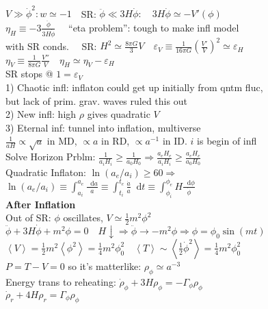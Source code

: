 \documentclass[12pt]{article}
\newcommand*\diff{\mathop{}\!\mathrm{d}}
\newcommand{\ve}{\varepsilon}
\begin{document}
{	\\$V\gg \dot{\phi}^2: w \simeq -1 \quad$SR: $\ddot{\phi}\ll 3H\dot{\phi}: \quad 3H\dot{\phi}\simeq - V'(\phi)$
	\\$\eta_H\equiv-3\frac{\ddot{\phi}}{3H\dot{\phi}} \quad$ ``eta problem'': tough to make infl model 
	\\with SR conds. $\quad$SR: $H^2\simeq \frac{8\pi G}{3}V\quad \varepsilon_V\equiv \frac{1}{16\pi G}\left(\frac{V'}{V}\right)^2\simeq \varepsilon_H$ 
	\\$\eta_V\equiv\frac{1}{8\pi G}\frac{V''}{V} \quad \eta_H\simeq\eta_V-\ve_H$
	\\SR stops @ $1=\ve_V$
	\\1) Chaotic infl: inflaton could get up initially from qntm fluc,
	\\but lack of prim. grav. waves ruled this out
	\\2) New infl: high $\rho$ gives quadratic $V$
	\\3) Eternal inf: tunnel into inflation, multiverse
	\\$\frac{1}{aH} \propto \sqrt{a}$ in MD, $\propto a$ in RD, $\propto a^{-1}$ in ID. $i$ is begin of infl
	\\Solve Horizon Prblm: $\frac{1}{a_iH_i}\geq \frac{1}{a_0H_0} \Rightarrow \frac{a_eH_e}{a_iH_i}\geq \frac{a_eH_e}{a_0H_0}$
	\\Quadratic Inflaton: $\ln(a_e/a_i)\geq 60\Rightarrow $
	\\$\ln(a_e/a_i)\equiv\int_{a_i}^{a_e}\frac{\diff a}{a}\equiv \int_{t_i}^{t_e}\frac{\dot{a}}{a}\diff t\equiv \int_{\phi_i}^{\phi_e}H\frac{\diff\phi}{\dot{\phi}}$
	\\\textbf{After Inflation}
	\\Out of SR: $\phi$ oscillates, $V\simeq\frac{1}{2}m^2\phi^2$
	\\$\ddot{\phi}+3H\dot{\phi}+m^2\phi=0 \quad H\downarrow\Rightarrow \ddot{\phi}\rightarrow-m^2\phi\Rightarrow \phi=\phi_0\sin(mt)$
	\\$\left<V\right>=\frac{1}{2}m^2\left<\phi^2\right>=\frac{1}{4}m^2\phi_0^2 \quad \left< T\right> \sim \left<\frac{1}{2}\dot{\phi}^2\right>=\frac{1}{4}m^2\phi_0^2$
	\\$P=T-V=0$ so it's matterlike: $\rho_\phi\simeq a^{-3}$
	\\Energy trans to reheating: $\dot{\rho}_\phi+3H\rho_\phi=-\Gamma_\phi\rho_\phi$
	\\$\dot{\rho}_r+4H\rho_r=\Gamma_\phi \rho_\phi$
	
	
}
\newpage
\hspace{-0.5cm}
\end{document}
